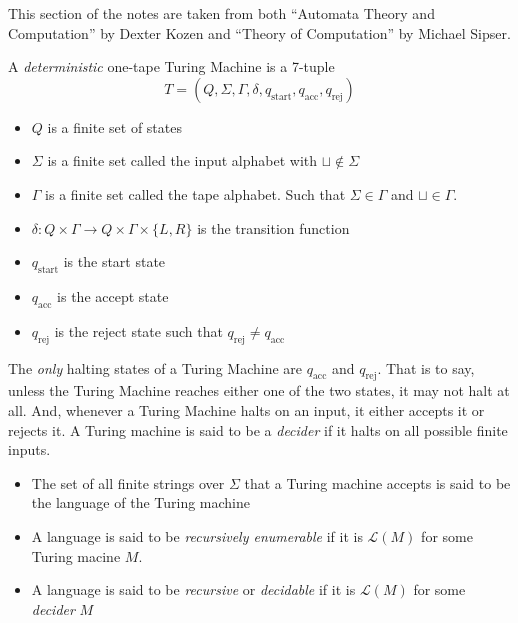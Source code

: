 This section of the notes are taken from both ``Automata Theory and Computation'' by Dexter Kozen and ``Theory of Computation'' by Michael Sipser.

\begin{definition}
    A \textit{deterministic} one-tape Turing Machine is a 7-tuple 
    \begin{equation*}
        T = (Q,\Sigma,\Gamma,\delta,q_\text{start},q_\text{acc}, q_\text{rej})
    \end{equation*}
    \begin{itemize}
        \item $Q$ is a finite set of states
        \item $\Sigma$ is a finite set called the input alphabet with $\sqcup\notin\Sigma$
        \item $\Gamma$ is a finite set called the tape alphabet. Such that $\Sigma\in\Gamma$ and $\sqcup\in\Gamma$.
        \item $\delta:Q\times\Gamma\to Q\times\Gamma\times\{L,R\}$ is the transition function
        \item $q_\text{start}$ is the start state 
        \item $q_\text{acc}$ is the accept state 
        \item $q_\text{rej}$ is the reject state such that $q_\text{rej}\neq q_\text{acc}$
    \end{itemize}
\end{definition}

The \textit{only} halting states of a Turing Machine are $q_\text{acc}$ and $q_\text{rej}$. That is to say, unless the Turing Machine reaches either one of the two states, it may not halt at all. And, whenever a Turing Machine halts on an input, it either accepts it or rejects it. A Turing machine is said to be a \textit{decider} if it halts on all possible finite inputs.

\begin{itemize}
    \item The set of all finite strings over $\Sigma$ that a Turing machine accepts is said to be the language of the Turing machine 
    \item A language is said to be \textit{recursively enumerable} if it is $\mathcal{L}(M)$ for some Turing macine $M$.
    \item A language is said to be \textit{recursive} or \textit{decidable} if it is $\mathcal{L}(M)$ for some \textit{decider} $M$
\end{itemize}

